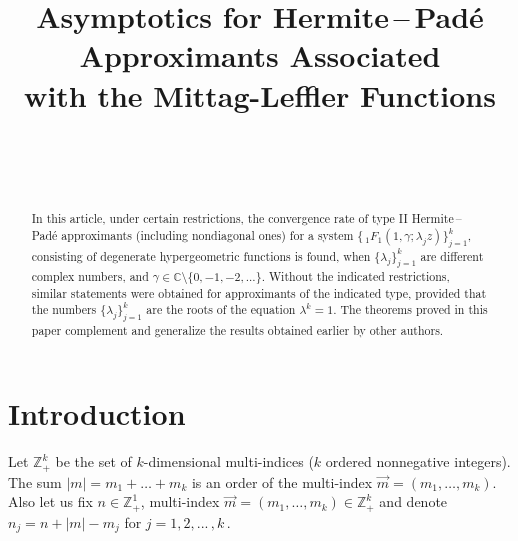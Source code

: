 \documentclass[
11pt,%
tightenlines,%
twoside,%
onecolumn,%
nofloats,%
nobibnotes,%
nofootinbib,%
superscriptaddress,%
noshowpacs,%
centertags]%
{revtex4}
\begin{document}

\title{Asymptotics for  Hermite\,--\,Pad\'e Approximants
Associated\\
 with  the Mittag-Leffler Functions}

\author{~}
 

\author{~}
 




\begin{abstract}
In this article, under certain restrictions, the convergence
rate of type II Hermite\,--\,Pad\'e approximants (including
nondiagonal ones) for a system $\{\,_1F_1(1,\gamma;\lambda_jz)\}_
{j=1}^k$, consisting of degenerate hypergeometric functions
is found, when $\{\lambda_j\}_{j=1}^k$ are different complex
numbers, and $\gamma\in\mathbb{C}\setminus \{0,-1,-2,...\}$.
Without the indicated restrictions, similar statements were
obtained for approximants of the indicated type, provided that
the numbers $\{\lambda_j\}_{j=1}^k$ are the roots of the
equation $\lambda^k=1$. The theorems proved in this paper
complement and generalize the results obtained earlier by
other authors.
\end{abstract}



 \maketitle


\section{Introduction}

Let $\mathbb{Z}^k_+$ be the set of $k$-dimensional multi-indices ($k$ ordered nonnegative integers).
The sum $|m|=m_1+\ldots+m_k$ is an order of the multi-index $\overrightarrow{m}=(m_1,\ldots,m_k)$.
Also let us fix $n\in \mathbb{Z}^1_+$,
multi-index $\overrightarrow{m}=(m_1,\ldots, m_k)\in
\mathbb{Z}^k_+$ and denote $n_j=n+|m|-m_j$ for
$j=1,2,...\,,k$\,.
\end{document}
